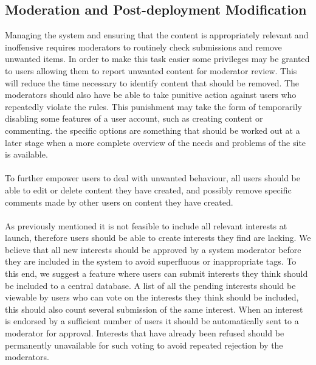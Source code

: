 \subsection{Moderation and Post-deployment Modification} %
\label{subsec:FurtherRequiredMod}

Managing the system and ensuring that the content is appropriately relevant and inoffensive requires moderators to routinely check submissions and remove unwanted items. In order to make this task easier some privileges may be granted to users allowing them to report unwanted content for moderator review.  This will reduce the time necessary to identify content that should be removed. The moderators should also have be able to take punitive action against users who repeatedly violate the rules. This punishment may take the form of temporarily disabling some features of a user account, such as creating content or commenting. the specific options are something that should be worked out at a later stage when a more complete overview of the needs and problems of the site is available.

\paragraph{} To further empower users to deal with unwanted behaviour, all users should be able to edit or delete content they have created, and possibly remove specific comments made by other users on content they have created.

\paragraph{} As previously mentioned it is not feasible to include all relevant interests at launch, therefore users should be able to create interests they find are lacking. We believe that all new interests should be approved by a system moderator before they are included in the system to avoid superfluous or inappropriate tags. To this end, we suggest a feature where users can submit interests they think should be included to a central database. A list of all the pending interests should be viewable by users who can vote on the interests they think should be included, this should also count several submission of the same interest. When an interest is endorsed by a sufficient number of users it should be automatically sent to a moderator for approval. Interests that have already been refused should be permanently unavailable for such voting to avoid repeated rejection by the moderators.

